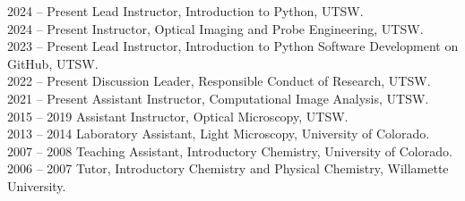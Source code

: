 2024 -- Present \hspace{14pt} Lead Instructor, Introduction to Python, UTSW. \\
2024 -- Present \hspace{14pt} Instructor, Optical Imaging and Probe Engineering, UTSW. \\
2023 -- Present \hspace{14pt} Lead Instructor, Introduction to Python Software Development on GitHub, UTSW. \\
2022 -- Present \hspace{14pt} Discussion Leader, Responsible Conduct of Research, UTSW. \\ 
2021 -- Present \hspace{14pt} Assistant Instructor, Computational Image Analysis, UTSW. \\
2015 -- 2019 \hspace{28pt} Assistant Instructor, Optical Microscopy, UTSW. \\
2013 -- 2014 \hspace{28pt} Laboratory Assistant, Light Microscopy, University of Colorado. \\
2007 -- 2008 \hspace{28pt} Teaching Assistant, Introductory Chemistry, University of Colorado.  \\
2006 -- 2007 \hspace{28pt} Tutor, Introductory Chemistry and Physical Chemistry, Willamette University. 
\vspace{6pt}